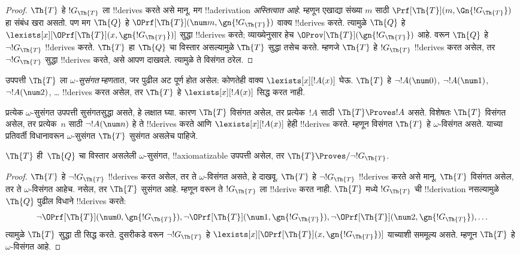 \documentclass[../../../include/open-logic-section]{subfiles}
\begin{document}
\begin{proof}
$\Th{T}$ हे $!G_\Th{T}$ ला
!!{derive}s करते असे मानू. मग
!!a{derivation} \emph{अस्तित्वात आहे}.
म्हणून एखाद्या संख्या $m$ साठी
$\Prf[\Th{T}](m,\Gn{!G_\Th{T}})$
हा संबंध खरा असतो. पण मग
$\Th{Q}$ हे
$\OPrf[\Th{T}](\num m, \gn{!G_\Th{T}})$
वाक्य !!{derive}s करते.
त्यामुळे $\Th{Q}$ हे
$\lexists[x][\OPrf[\Th{T}](x,\gn{!G_\Th{T}})]$
सुद्धा !!{derive}s करते; व्याख्येनुसार
हेच $\OProv[\Th{T}](\gn{!G_\Th{T}})$
आहे.  वरून
$\Th{Q}$ हे $\lnot !G_\Th{T}$
!!{derive}s करते. $\Th{T}$ हा
$\Th{Q}$ चा विस्तार असल्यामुळे
$\Th{T}$ सुद्धा तसेच करते.
म्हणजे $\Th{T}$ हे $!G_\Th{T}$
!!{derive}s करत असेल, तर
$\lnot !G_\Th{T}$ सुद्धा
!!{derive}s करते, असे आपण दाखवले.
त्यामुळे ते विसंगत ठरेल.
\end{proof}

\begin{defn}
उपपत्ती $\Th{T}$ ला
\emph{$\omega$-सुसंगत} म्हणतात, जर
पुढील अट पूर्ण होत असेल: कोणतेही
वाक्य $\lexists[x][!A(x)]$ घेऊ.
$\Th{T}$ हे $\lnot !A(\num 0)$,
$\lnot !A(\num 1)$,
$\lnot !A(\num 2)$, \dots
!!{derive}s करत असेल, तर
$\Th{T}$ हे $\lexists[x][!A(x)]$ सिद्ध करत नाही.
\end{defn}

प्रत्येक $\omega$-सुसंगत उपपत्ती
सुसंगतसुद्धा असते, हे लक्षात घ्या.
कारण $\Th{T}$ विसंगत असेल, तर
प्रत्येक~$!A$ साठी $\Th{T} \Proves !A$
असते. विशेषतः $\Th{T}$ विसंगत
असेल, तर प्रत्येक~$n$ साठी
$\lnot !A(\num n)$ हे ते
!!{derive}s करते आणि
$\lexists[x][!A(x)]$ हेही
!!{derive}s करते.
म्हणून विसंगत $\Th{T}$ हे
$\omega$-विसंगत असते. याच्या
प्रतिवर्ती विधानावरून
$\omega$-सुसंगत $\Th{T}$
सुसंगत असलेच पाहिजे.

\begin{lem}
$\Th{T}$ ही~$\Th{Q}$ चा विस्तार
असलेली $\omega$-सुसंगत,
!!{axiomatizable} उपपत्ती
असेल, तर
$\Th{T} \Proves/ \lnot !G_\Th{T}$.
\end{lem}

\begin{proof}
$\Th{T}$ हे $\lnot !G_\Th{T}$
!!{derive}s करत असेल, तर ते
$\omega$-विसंगत असते, हे दाखवू.
$\Th{T}$ हे $\lnot !G_\Th{T}$
!!{derive}s करते असे मानू.
$\Th{T}$ विसंगत असेल, तर ते
$\omega$-विसंगत आहेच.
नसेल, तर $\Th{T}$ सुसंगत आहे.
म्हणून 
वरून ते $!G_\Th{T}$ ला
!!{derive} करत नाही. $\Th{T}$
मध्ये $!G_\Th{T}$ ची
!!{derivation} नसल्यामुळे
$\Th{Q}$ पुढील विधाने
!!{derive}s करते:
\[
\lnot \OPrf[\Th{T}](\num 0, \gn{!G_\Th{T}}), \lnot \OPrf[\Th{T}](\num 1,
\gn{!G_\Th{T}}), \lnot \OPrf[\Th{T}](\num 2, \gn{!G_\Th{T}}), \dots
\]
त्यामुळे $\Th{T}$ सुद्धा ती
सिद्ध करते. दुसरीकडे
 वरून
$\lnot !G_\Th{T}$ हे
$\lexists[x][\OPrf[\Th{T}](x,\gn{!G_\Th{T}})]$
याच्याशी सममूल्य असते.
म्हणून $\Th{T}$ हे
$\omega$-विसंगत आहे.
\end{proof}
\end{document}
